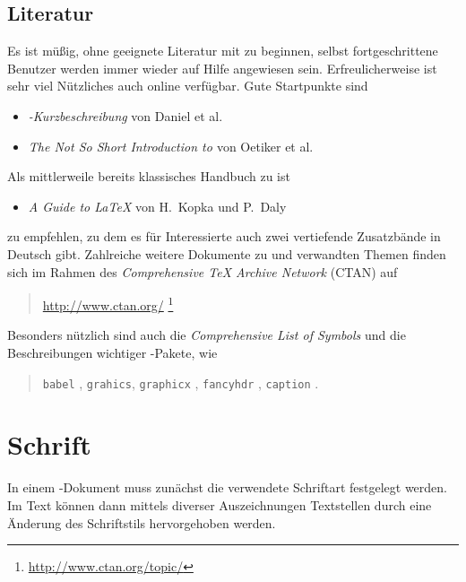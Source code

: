 \subsection{Literatur}
\label{sec:literatur}

Es ist müßig, ohne geeignete Literatur mit \latex zu beginnen, selbst
fortgeschrittene Benutzer werden immer wieder auf Hilfe angewiesen
sein. Erfreulicherweise ist sehr viel Nützliches auch online verfügbar.
Gute Startpunkte sind \zB
%
\begin{itemize}
\item \emph{\textrm{\LaTeXe}-Kurzbeschreibung} von Daniel et al.\ \cite{Daniel2016}
\item \emph{The Not So Short Introduction to \textrm{\LaTeXe}}
            von Oetiker et al.\ \cite{Oetiker2015}
\end{itemize}
%
\noindent
Als mittlerweile bereits klassisches Handbuch zu \latex ist
%
\begin{itemize}
  \item \emph{A Guide to \textrm{\LaTeX}} von H.~Kopka und P.~Daly \cite{Kopka2003}
\end{itemize}
%
zu empfehlen, zu dem es für Interessierte auch zwei vertiefende
Zusatzbände in Deutsch gibt. Zahlreiche weitere Dokumente zu
\latex und verwandten Themen finden sich \ua im Rahmen des {\em
Comprehensive TeX Archive Network} (CTAN) auf
\begin{quote}
	\url{http://www.ctan.org/}%
	\footnote{\url{http://www.ctan.org/topic/}}
\end{quote}
%
Besonders nützlich sind auch die
\emph{Comprehensive List of \textrm{\latex} Symbols} \cite{Pakin2017}
und die Beschreibungen wichtiger \latex-Pakete, wie
%
\begin{quote}
  \texttt{babel} \cite{Bezos2016},\newline
  \texttt{grahics}, \texttt{graphicx} \cite{Carlisle2016},\newline
  \texttt{fancyhdr} \cite{Oostrum2016},\newline
  \texttt{caption} \cite{Sommerfeldt2011}.
\end{quote}


\section{Schrift}

In einem \latex-Dokument muss zunächst die verwendete Schriftart festgelegt werden. Im Text können dann mittels diverser Auszeichnungen Textstellen durch eine Änderung des Schriftstils hervorgehoben werden.

